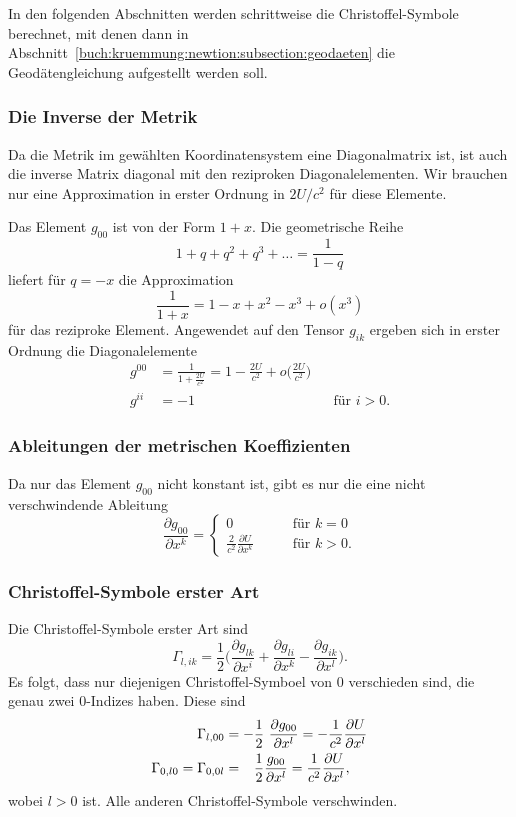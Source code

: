 In den folgenden Abschnitten werden schrittweise die Christoffel-Symbole
berechnet, mit denen dann in
Abschnitt~\ref{buch:kruemmung:newtion:subsection:geodaeten}
die Geodätengleichung aufgestellt werden soll.

%
%
\subsubsection{Die Inverse der Metrik}
Da die Metrik im gewählten Koordinatensystem eine Diagonalmatrix ist,
ist auch die inverse Matrix diagonal mit den reziproken Diagonalelementen.
Wir brauchen nur eine Approximation in erster Ordnung in $2U/c^2$
für diese Elemente.

Das Element $g_{00}$ ist von der Form $1+x$.
Die geometrische Reihe
\[
1+q+q^2+q^3+\dots = \frac{1}{1-q}
\]
liefert für $q=-x$ die Approximation
\[
\frac{1}{1+x} = 1-x+x^2-x^3+o(x^3)
\]
für das reziproke Element.
Angewendet auf den Tensor $g_{ik}$ ergeben sich in erster Ordnung
die Diagonalelemente
\begin{equation}
\begin{aligned}
g^{00}
&=
\frac{1}{\displaystyle 1+\frac{2U}{c^2}}
=
1-\frac{2U}{c^2}+o\biggl(\frac{2U}{c^2}\biggr)
\\
g^{ii}&= -1
&&\text{für $i>0$.}
\end{aligned}
\end{equation}

%
%
\subsubsection{Ableitungen der metrischen Koeffizienten}
Da nur das Element $g_{00}$ nicht konstant ist, gibt es nur die eine
nicht verschwindende Ableitung
\[
\frac{\partial g_{00}}{\partial x^k}
=
\begin{cases}
0
&\qquad\text{für $k=0$}\\[4pt]
\displaystyle
\frac{2}{c^2}
\frac{\partial U}{\partial x^k}
&\qquad\text{für $k>0$.}
\end{cases}
\]

%
%
\subsubsection{Christoffel-Symbole erster Art}
Die Christoffel-Symbole erster Art sind
\[
\Gamma_{l,ik}
=
\frac{1}{2}\biggl(
\frac{\partial g_{lk}}{\partial x^i}
+
\frac{\partial g_{li}}{\partial x^k}
-
\frac{\partial g_{ik}}{\partial x^l}
\biggr).
\]
Es folgt, dass nur diejenigen Christoffel-Symboel von $0$ verschieden
sind, die genau zwei $0$-Indizes haben.
Diese sind
\begin{align}
\Gamma_{l,00}
&=
-\frac12 \frac{\partial g_{00}}{\partial x^l}
=
-
\frac{1}{c^2}\frac{\partial U}{\partial x^l}
\notag
\\
\Gamma_{0,l0}
=
\Gamma_{0,0l}
&=
\phantom{-}
\frac{1}{2}\frac{g_{00}}{\partial x^l}
=
\frac{1}{c^2}\frac{\partial U}{\partial x^l},
\label{buch:kruemmung:newton:eqn:bewegungsgleichung}
\end{align}
wobei $l>0$ ist.
Alle anderen Christoffel-Symbole verschwinden.

